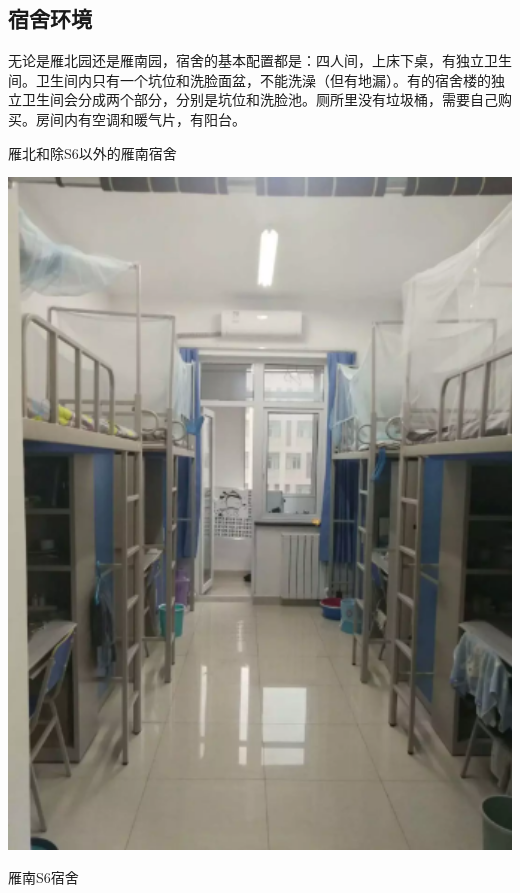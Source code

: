 \documentclass[UTF8]{ctexart}
\begin{document}
\subsection*{宿舍环境}

无论是雁北园还是雁南园，宿舍的基本配置都是：四人间，上床下桌，有独立卫生间。卫生间内只有一个坑位和洗脸面盆，不能洗澡（但有地漏）。有的宿舍楼的独立卫生间会分成两个部分，分别是坑位和洗脸池。厕所里没有垃圾桶，需要自己购买。房间内有空调和暖气片，有阳台。

\begin{center}
\begin{minipage}{0.45\textwidth}
    \centerline{\fangsong\small 雁北和除S6以外的雁南宿舍}
    \centerline{\includegraphics[width=1\textwidth]{images/dorm.png}}
\end{minipage}
\qquad
\begin{minipage}{0.45\textwidth}
    \centerline{\fangsong\small 雁南S6宿舍}

\end{minipage}
\end{center}
\end{document}
